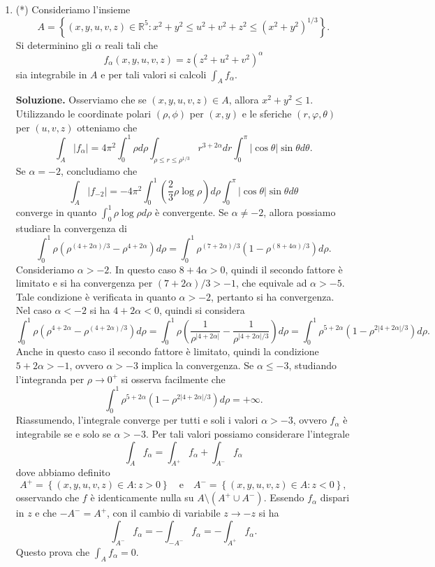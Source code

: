\begin{enumerate}
	
	\item (*) Consideriamo l'insieme
	\[
	A = \left\{(x,y,u,v,z) \in \mathbb{R}^5 : x^2 + y^2 \leq u^2 + v^2 + z^2 \leq (x^2 + y^2)^{1/3}\right\}.
	\]
	Si determinino gli $\alpha$ reali tali che
	\[
	f_{\alpha}(x,y,u,v,z) = z \left(z^2 + u^2 + v^2\right)^{\alpha}
	\]
	sia integrabile in $A$ e per tali valori si calcoli $\int_A f_{\alpha}$.
	
	\textbf{Soluzione.}
		Osserviamo che se $(x,y,u,v,z) \in A$, allora $x^2 + y^2 \leq 1$. Utilizzando le coordinate polari $(\rho, \phi)$ per $(x,y)$ e le sferiche $(r, \varphi, \theta)$ per $(u,v,z)$ otteniamo che
		\[
		\int_A |f_{\alpha}| = 4\pi^2 \int_0^1 \rho d\rho \int_{\rho \leq r \leq \rho^{1/3}} r^{3 + 2\alpha} dr \int_0^{\pi} |\cos \theta| \sin \theta d\theta.
		\]
		Se $\alpha = -2$, concludiamo che
		\[
		\int_A |f_{-2}| = -4\pi^2 \int_0^1 \left(\frac{2}{3} \rho \log \rho\right) d\rho \int_0^{\pi} |\cos \theta| \sin \theta d\theta
		\]
		converge in quanto $\int_0^1 \rho \log \rho d\rho$ è convergente. Se $\alpha \neq -2$, allora possiamo studiare la convergenza di
		\[
		\int_0^1 \rho \left(\rho^{(4 + 2\alpha)/3} - \rho^{4 + 2\alpha}\right) d\rho = \int_0^1 \rho^{(7 + 2\alpha)/3} \left(1 - \rho^{(8 + 4\alpha)/3}\right) d\rho.
		\]
		Consideriamo $\alpha > -2$. In questo caso $8 + 4\alpha > 0$, quindi il secondo fattore è limitato e si ha convergenza per $(7 + 2\alpha)/3 > -1$, che equivale ad $\alpha > -5$. Tale condizione è verificata in quanto $\alpha > -2$, pertanto si ha convergenza. Nel caso $\alpha < -2$ si ha $4 + 2\alpha < 0$, quindi si considera
		\[
		\int_0^1 \rho \left(\rho^{4 + 2\alpha} - \rho^{(4 + 2\alpha)/3}\right) d\rho = \int_0^1 \rho \left(\frac{1}{\rho^{|4 + 2\alpha|}} - \frac{1}{\rho^{|4 + 2\alpha|/3}}\right) d\rho = \int_0^1 \rho^{5 + 2\alpha} \left(1 - \rho^{2|4 + 2\alpha|/3}\right) d\rho.
		\]
		Anche in questo caso il secondo fattore è limitato, quindi la condizione $5 + 2\alpha > -1$, ovvero $\alpha > -3$ implica la convergenza. Se $\alpha \leq -3$, studiando l'integranda per $\rho \to 0^+$ si osserva facilmente che
		\[
		\int_0^1 \rho^{5 + 2\alpha} \left(1 - \rho^{2|4 + 2\alpha|/3}\right) d\rho = +\infty.
		\]
		Riassumendo, l'integrale converge per tutti e soli i valori $\alpha > -3$, ovvero $f_{\alpha}$ è integrabile se e solo se $\alpha > -3$. Per tali valori possiamo considerare l'integrale
		\[
		\int_A f_{\alpha} = \int_{A^+} f_{\alpha} + \int_{A^-} f_{\alpha}
		\]
		dove abbiamo definito
		\[
		A^+ = \left\{(x,y,u,v,z) \in A : z > 0\right\} \quad \text{e} \quad A^- = \left\{(x,y,u,v,z) \in A : z < 0\right\},
		\]
		osservando che $f$ è identicamente nulla su $A \setminus (A^+ \cup A^-)$. Essendo $f_{\alpha}$ dispari in $z$ e che $-A^- = A^+$, con il cambio di variabile $z \to -z$ si ha
		\[
		\int_{A^-} f_{\alpha} = -\int_{-A^-} f_{\alpha} = -\int_{A^+} f_{\alpha}.
		\]
		Questo prova che $\int_A f_{\alpha} = 0$.


\end{enumerate}
